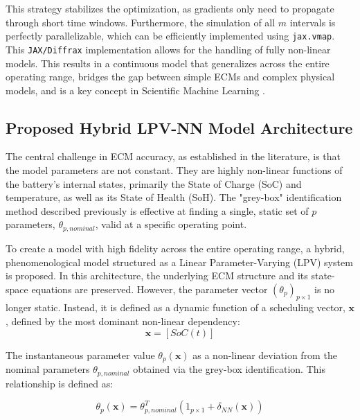 \documentclass[lettersize,journal]{IEEEtran}
\begin{document}
This strategy stabilizes the optimization, as gradients only need to propagate through short time windows. Furthermore, the simulation of all $m$ intervals is perfectly parallelizable, which can be efficiently implemented using \texttt{jax.vmap}. This \texttt{JAX/Diffrax} implementation allows for the handling of fully non-linear models. This results in a continuous model that generalizes across the entire operating range, bridges the gap between simple ECMs and complex physical models, and is a key concept in Scientific Machine Learning \cite{rackauckas2020universal}.

\subsection{Proposed Hybrid LPV-NN Model Architecture}

The central challenge in ECM accuracy, as established in the literature, is that the model parameters are not constant. They are highly non-linear functions of the battery's internal states, primarily the State of Charge (SoC) and temperature, as well as its State of Health (SoH)\cite{tran2021comprehensive, yang2023improved}. The "grey-box" identification method described previously is effective at finding a single, static set of $p$ parameters, $\theta_{p, nominal}$, valid at a specific operating point.

To create a model with high fidelity across the entire operating range, a hybrid, phenomenological model structured as a Linear Parameter-Varying (LPV) system is proposed. In this architecture, the underlying ECM structure and its state-space equations are preserved. However, the parameter vector $(\theta_p)_{p\times 1}$ is no longer static. Instead, it is defined as a dynamic function of a scheduling vector, $\mathbf{x}$, defined by the most dominant non-linear dependency:
\begin{equation}
	\label{eq:scheduling_vector}
	\mathbf{x} = [SoC(t)]
\end{equation}

The instantaneous parameter value $\theta_p(\mathbf{x})$ as a non-linear deviation from the nominal parameters $\theta_{p, nominal}$ obtained via the grey-box identification. This relationship is defined as:

\begin{equation}
	\label{eq:lpv_param}
	\theta_p(\mathbf{x}) = \theta_{p, nominal}^T(1_{p\times 1} + \delta_{NN}(\mathbf{x}))
\end{equation}
\end{document}
